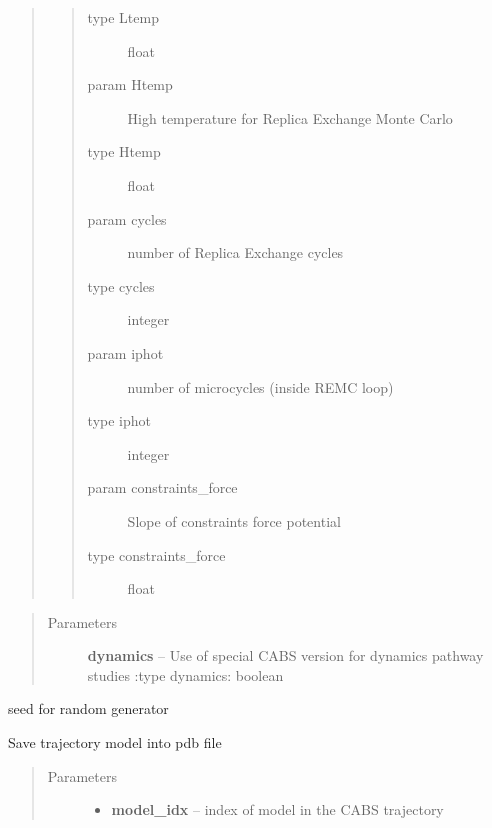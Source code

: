 \documentclass[letterpaper,10pt,english]{sphinxmanual}
\begin{document}
\begin{fulllineitems}
\begin{fulllineitems}
\begin{quote}
\begin{quote}
\begin{description}
\item[{type Ltemp}] \leavevmode
float

\item[{param Htemp}] \leavevmode
High temperature for Replica Exchange Monte Carlo

\item[{type Htemp}] \leavevmode
float

\item[{param cycles}] \leavevmode
number of Replica Exchange cycles

\item[{type cycles}] \leavevmode
integer

\item[{param iphot}] \leavevmode
number of microcycles (inside REMC loop)

\item[{type iphot}] \leavevmode
integer

\item[{param constraints\_force}] \leavevmode
Slope of constraints force potential

\item[{type constraints\_force}] \leavevmode
float

\end{description}\end{quote}
\end{quote}
\begin{quote}\begin{description}
\item[{Parameters}] \leavevmode
\textbf{dynamics} -- Use of special CABS version for dynamics pathway studies
:type dynamics: boolean

\end{description}\end{quote}

\end{fulllineitems}


\begin{fulllineitems}
\label{api:pycabs.CABS.rng_seed}
seed for random generator

\end{fulllineitems}


\begin{fulllineitems}
\label{api:pycabs.CABS.savePdbModel}
Save trajectory model into pdb file
\begin{quote}\begin{description}
\item[{Parameters}] \leavevmode\begin{itemize}
\item {} 
\textbf{model\_idx} -- index of model in the CABS trajectory


\end{itemize}
\end{description}
\end{quote}
\end{fulllineitems}
\end{fulllineitems}
\end{document}
